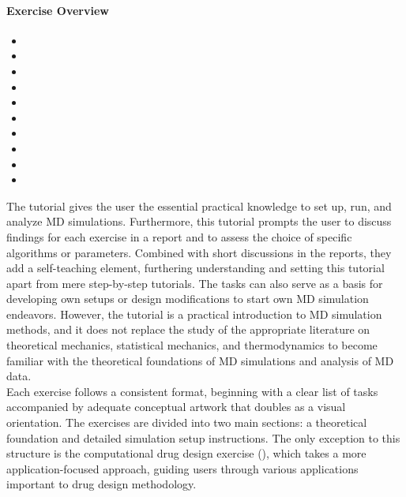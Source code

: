 \documentclass[9pt,tutorial]{livecoms}
\begin{document}
\paragraph{Exercise Overview}
\begin{itemize}
    \item {}
    \item {}
    \item {}    
    \item {}
    \item {}
    \item {}
    \item {}
    \item {}
    \item {}
    \item {}
\end{itemize}
The tutorial gives the user the essential practical knowledge to set up, run, and analyze MD simulations. Furthermore, this tutorial prompts the user to discuss findings for each exercise in a report and to assess the choice of specific algorithms or parameters. Combined with short discussions in the reports, they add a self-teaching element, furthering understanding and setting this tutorial apart from mere step-by-step tutorials. The tasks can also serve as a basis for developing own setups or design modifications to start own MD simulation endeavors. However, the tutorial is a practical introduction to MD simulation methods, and it does not replace the study of the appropriate literature on theoretical mechanics, statistical mechanics, and thermodynamics to become familiar with the theoretical foundations of MD simulations and analysis of MD data.\\
Each exercise follows a consistent format, beginning with a clear list of tasks accompanied by adequate conceptual artwork that doubles as a visual orientation. The exercises are divided into two main sections: a theoretical foundation and detailed simulation setup instructions. The only exception to this structure is the computational drug design exercise (), which takes a more application-focused approach, guiding users through various applications important to drug design methodology.\\
\end{document}

